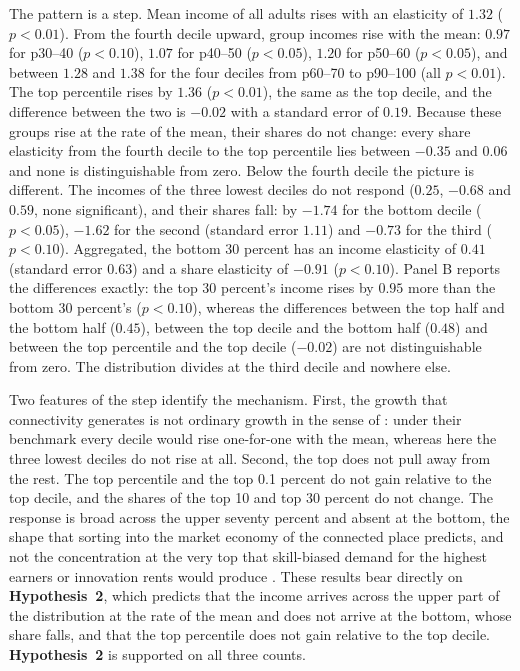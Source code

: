 The pattern is a step. Mean income of all adults rises with an elasticity of $1.32$ ($p<0.01$). From the fourth decile upward, group incomes rise with the mean: $0.97$ for p30--40 ($p<0.10$), $1.07$ for p40--50 ($p<0.05$), $1.20$ for p50--60 ($p<0.05$), and between $1.28$ and $1.38$ for the four deciles from p60--70 to p90--100 (all $p<0.01$). The top percentile rises by $1.36$ ($p<0.01$), the same as the top decile, and the difference between the two is $-0.02$ with a standard error of $0.19$. Because these groups rise at the rate of the mean, their shares do not change: every share elasticity from the fourth decile to the top percentile lies between $-0.35$ and $0.06$ and none is distinguishable from zero. Below the fourth decile the picture is different. The incomes of the three lowest deciles do not respond ($0.25$, $-0.68$ and $0.59$, none significant), and their shares fall: by $-1.74$ for the bottom decile ($p<0.05$), $-1.62$ for the second (standard error $1.11$) and $-0.73$ for the third ($p<0.10$). Aggregated, the bottom 30 percent has an income elasticity of $0.41$ (standard error $0.63$) and a share elasticity of $-0.91$ ($p<0.10$). Panel B reports the differences exactly: the top 30 percent's income rises by $0.95$ more than the bottom 30 percent's ($p<0.10$), whereas the differences between the top half and the bottom half ($0.45$), between the top decile and the bottom half ($0.48$) and between the top percentile and the top decile ($-0.02$) are not distinguishable from zero. The distribution divides at the third decile and nowhere else.

Two features of the step identify the mechanism. First, the growth that connectivity generates is not ordinary growth in the sense of \citet{Dollar_2016}: under their benchmark every decile would rise one-for-one with the mean, whereas here the three lowest deciles do not rise at all. Second, the top does not pull away from the rest. The top percentile and the top 0.1 percent do not gain relative to the top decile, and the shares of the top 10 and top 30 percent do not change. The response is broad across the upper seventy percent and absent at the bottom, the shape that sorting into the market economy of the connected place predicts, and not the concentration at the very top that skill-biased demand for the highest earners or innovation rents would produce \citep{Aghion_2018}. These results bear directly on \textbf{Hypothesis~2}, which predicts that the income arrives across the upper part of the distribution at the rate of the mean and does not arrive at the bottom, whose share falls, and that the top percentile does not gain relative to the top decile. \textbf{Hypothesis~2} is supported on all three counts.

